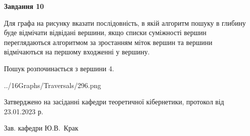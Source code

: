 \documentclass[12pt, ukrainian]{article}
\begin{document}
{\begin {large}
{\begin {center}\textbf{Завдання 10}\end {center}}\par
Для графа на рисунку вказати послідовність, в якій алгоритм пошуку в глибину буде відмічати відвідані вершини, якщо списки суміжності вершин переглядаються алгоритмом за зростанням міток вершин та вершини відмічаються на першому вход\-женні у вершину.\par
Пошук розпочинається з вершини 4.\par

\begin{center}
	{../16Graphs/Traversals/296.png}
\end{center}\par
\newpage


\end {large}
}
{\smallskip \begin {small} Затверджено на засіданні кафедри теоретичної кібернетики, протокол  від   23.01.2023 р.\par\smallskip\smallskip
{\parbox {6.5 cm}{Зав. кафедри \dotfill Ю.В.~Крак}} \end{small}}
\end{document}
